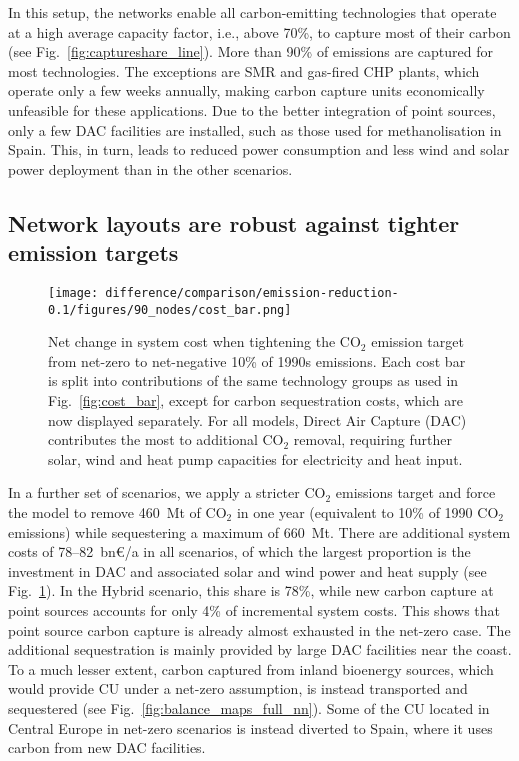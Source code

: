 \documentclass[twocolumn]{article}
\newcommand{\carbon}{CO$_2$}
\newcommand{\hybridscenario}{Hybrid scenario}
\begin{document}
In this setup, the networks enable all carbon-emitting technologies that operate at a high average capacity factor, i.e., above 70\%, to capture most of their carbon (see Fig.~\ref{fig:captureshare_line}). More than 90\% of emissions are captured for most technologies. The exceptions are SMR and gas-fired CHP plants, which operate only a few weeks annually, making carbon capture units economically unfeasible for these applications.
Due to the better integration of point sources, only a few DAC facilities are installed, such as those used for methanolisation in Spain. This, in turn, leads to reduced power consumption and less wind and solar power deployment than in the other scenarios.


\subsection*{Network layouts are robust against tighter emission targets}
\begin{figure}[htb!]
    \centering
    \texttt{[image: difference/comparison/emission-reduction-0.1/figures/90\_nodes/cost\_bar.png]}
    \caption[short]{Net change in system cost when tightening the \carbon{} emission target from net-zero to net-negative 10\% of 1990s emissions. Each cost bar is split into contributions of the same technology groups as used in Fig.~\ref{fig:cost_bar}, except for carbon sequestration costs, which are now displayed separately. For all models, Direct Air Capture (DAC) contributes the most to additional \carbon{} removal, requiring further solar, wind and heat pump capacities for electricity and heat input.}
    \label{fig:net-negative_cost_bar}
\end{figure}


In a further set of scenarios, we apply a stricter \carbon{} emissions target and force the model to remove 460~Mt of \carbon{} in one year (equivalent to 10\% of 1990 \carbon{} emissions) while sequestering a maximum of 660~Mt. There are additional system costs of 78--82~bn€/a in all scenarios, of which the largest proportion is the investment in DAC and associated solar and wind power and heat supply (see Fig.~\ref{fig:net-negative_cost_bar}). In the \hybridscenario{}, this share is 78\%, while new carbon capture at point sources accounts for only 4\% of incremental system costs. This shows that point source carbon capture is already almost exhausted in the net-zero case. The additional sequestration is mainly provided by large DAC facilities near the coast. To a much lesser extent, carbon captured from inland bioenergy sources, which would provide CU under a net-zero assumption, is instead transported and sequestered (see Fig.~\ref{fig:balance_maps_full_nn}). Some of the CU located in Central Europe in net-zero scenarios is instead diverted to Spain, where it uses carbon from new DAC facilities.
\end{document}
